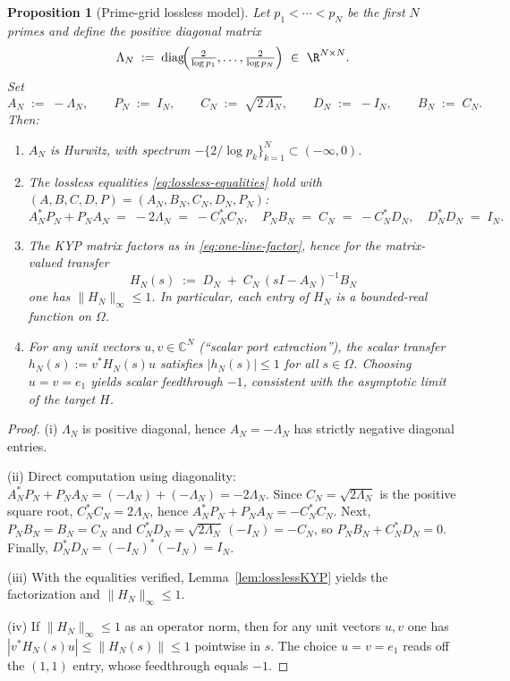 \documentclass[11pt]{article}
\newtheorem{proposition}[theorem]{Proposition}
\theoremstyle{remark}
\newcommand{\C}{\mathbb{C}}
\begin{document}
\begin{proposition}[Prime-grid lossless model]\label{prop:prime-grid-KYP}
Let \(p_1<\cdots<p_N\) be the first \(N\) primes and define the positive diagonal matrix
\[
 \Lambda_N\;:=\;\mathrm{diag}\!\Big(\tfrac{2}{\log p_1},\dots,\tfrac{2}{\log p_N}\Big)\ \in\ \R^{N\times N}.
\]
Set
\[
 A_N\;:=\;-\Lambda_N,\qquad P_N\;:=\;I_N,\qquad C_N\;:=\;\sqrt{2\,\Lambda_N},\qquad D_N\;:=\;-I_N,\qquad B_N\;:=\;C_N.
\]
Then:
\begin{enumerate}
 \item \(A_N\) is Hurwitz, with spectrum \(-\{2/\log p_k\}_{k=1}^N\subset(-\infty,0)\).
 \item The lossless equalities \eqref{eq:lossless-equalities} hold with \((A,B,C,D,P)=(A_N,B_N,C_N,D_N,P_N)\):
 \[
  A_N^*P_N+P_NA_N\;=\;-2\Lambda_N\;=\;-C_N^*C_N,\quad P_NB_N\;=\;C_N\;=\;-C_N^*D_N,\quad D_N^*D_N\;=\;I_N.
 \]
 \item The KYP matrix factors as in \eqref{eq:one-line-factor}, hence for the matrix-valued transfer
 \[
  H_N(s)\;:=\;D_N\; +\; C_N\,(sI-A_N)^{-1} B_N
 \]
one has \(\|H_N\|_\infty\le 1\). In particular, each entry of \(H_N\) is a bounded-real function on \(\Omega\).
 \item For any unit vectors \(u,v\in\C^N\) (``scalar port extraction''), the scalar transfer \(h_N(s):=v^*H_N(s)u\) satisfies \(|h_N(s)|\le 1\) for all \(s\in\Omega\). Choosing \(u=v=e_1\) yields scalar feedthrough \(-1\), consistent with the asymptotic limit of the target \(H\).
\end{enumerate}
\end{proposition}
\begin{proof}
(i) \(\Lambda_N\) is positive diagonal, hence \(A_N=-\Lambda_N\) has strictly negative diagonal entries.

(ii) Direct computation using diagonality: \(A_N^*P_N+P_NA_N=(-\Lambda_N)+(-\Lambda_N)=-2\Lambda_N\). Since \(C_N=\sqrt{2\Lambda_N}\) is the positive square root, \(C_N^*C_N=2\Lambda_N\), hence \(A_N^*P_N+P_NA_N=-C_N^*C_N\). Next, \(P_NB_N=B_N=C_N\) and \(C_N^*D_N=\sqrt{2\Lambda_N}\,(-I_N)=-C_N\), so \(P_NB_N+ C_N^*D_N=0\). Finally, \(D_N^*D_N=(-I_N)^*(-I_N)=I_N\).

(iii) With the equalities verified, Lemma~\ref{lem:losslessKYP} yields the factorization and \(\|H_N\|_\infty\le 1\).

(iv) If \(\|H_N\|_\infty\le 1\) as an operator norm, then for any unit vectors \(u,v\) one has \(|v^*H_N(s)u|\le \|H_N(s)\|\le 1\) pointwise in \(s\). The choice \(u=v=e_1\) reads off the \((1,1)\) entry, whose feedthrough equals \(-1\).
\end{proof}
\end{document}

